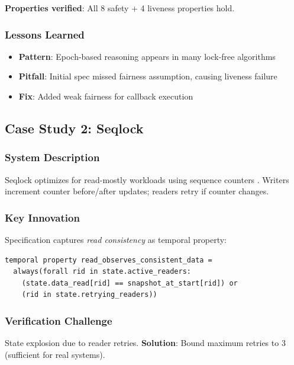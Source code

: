 \documentclass[conference]{IEEEtran}
\begin{document}
\textbf{Properties verified}: All 8 safety + 4 liveness properties hold.

\subsubsection{Lessons Learned}

\begin{itemize}
\item \textbf{Pattern}: Epoch-based reasoning appears in many lock-free algorithms
\item \textbf{Pitfall}: Initial spec missed fairness assumption, causing liveness failure
\item \textbf{Fix}: Added weak fairness for callback execution
\end{itemize}

\subsection{Case Study 2: Seqlock}

\subsubsection{System Description}

Seqlock optimizes for read-mostly workloads using sequence counters \cite{linux_seqlock}. Writers increment counter before/after updates; readers retry if counter changes.

\subsubsection{Key Innovation}

Specification captures \textit{read consistency} as temporal property:

\begin{lstlisting}
temporal property read_observes_consistent_data =
  always(forall rid in state.active_readers:
    (state.data_read[rid] == snapshot_at_start[rid]) or
    (rid in state.retrying_readers))
\end{lstlisting}

\subsubsection{Verification Challenge}

State explosion due to reader retries. \textbf{Solution}: Bound maximum retries to 3 (sufficient for real systems).
\end{document}
